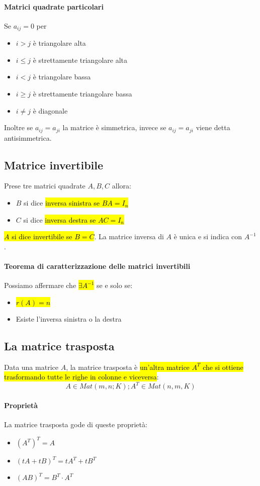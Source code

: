 \paragraph{Matrici quadrate particolari} Se $a_{ij} = 0$ per
\begin{itemize}
    \item $i>j$ è triangolare alta
    \item $i \leq j$ è strettamente triangolare alta
    \item $i<j$ è triangolare bassa
    \item $i \geq j$ è strettamente triangolare bassa
    \item $i \neq j$ è diagonale
\end{itemize}
Inoltre se $a_{ij} = a_{ji}$ la matrice è simmetrica, invece se $a_{ij} = a_{ji}$
viene detta antisimmetrica.

\subsection{Matrice invertibile}
Prese tre matrici quadrate $A, B, C$ allora:
\begin{itemize}
    \item $B$ si dice \hl{inversa sinistra se $BA = I_{n}$}
    \item $C$ si dice \hl{inversa destra se $AC = I_{n}$}
\end{itemize}
\hl{$A$ si dice invertibile se $B = C$}. La matrice inversa di $A$ è unica e
si indica con $A^{-1}$.

\paragraph{Teorema di caratterizzazione delle matrici invertibili} Possiamo
affermare che \hl{$\exists A^{-1}$} se e solo se:
\begin{itemize}
    \item \hl{$r(A) = n$}
    \item Esiste l'inversa sinistra o la destra
\end{itemize}

\subsection{La matrice trasposta}
Data una matrice $A$, la matrice trasposta è \hl{un'altra matrice $A^T$ che si
ottiene trasformando tutte le righe in colonne e viceversa}:
\[
    A \in Mat(m,n;K); A^T \in Mat(n,m,K)
\]

\paragraph{Proprietà} La matrice trasposta gode di queste proprietà:
\begin{itemize}
    \item $(A^T)^T = A$
    \item $(tA + tB)^T = tA^T + tB^T$
    \item $(AB)^T = B^T \cdot A^T$
\end{itemize}


